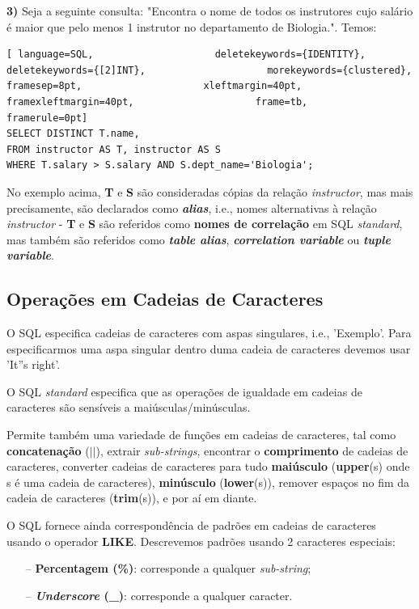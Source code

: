 \documentclass[titlepage]{book}
\theoremstyle{definition}
\begin{document}
\textbf{3)} Seja a seguinte consulta: "Encontra o nome de todos os instrutores cujo salário é maior que pelo menos 1 instrutor no departamento de Biologia.". Temos:
\begin{lstlisting}[ language=SQL,                     deletekeywords={IDENTITY},                     deletekeywords={[2]INT},                     morekeywords={clustered},                     framesep=8pt,                     xleftmargin=40pt,                     framexleftmargin=40pt,                     frame=tb,                     framerule=0pt]
SELECT DISTINCT T.name,
FROM instructor AS T, instructor AS S
WHERE T.salary > S.salary AND S.dept_name='Biologia';
\end{lstlisting}

No exemplo acima, \textbf{T} e \textbf{S} são consideradas cópias da relação \textit{instructor}, mas mais precisamente, são declarados como \textbf{\textit{alias}}, i.e., nomes alternativas à relação \textit{instructor} - \textbf{T} e \textbf{S} são referidos como \textbf{nomes de correlação} em SQL \textit{standard}, mas também são referidos como \textbf{\textit{table alias}}, \textbf{\textit{correlation variable}} ou \textbf{\textit{tuple variable}}.

\subsection{Operações em Cadeias de Caracteres}

O SQL especifica cadeias de caracteres com aspas singulares, i.e., 'Exemplo'. Para especificarmos uma aspa singular dentro duma cadeia de caracteres devemos usar 'It''s right'.

O SQL \textit{standard} especifica que as operações de igualdade em cadeias de caracteres são sensíveis a maiúsculas/minúsculas.

Permite também uma variedade de funções em cadeias de caracteres, tal como \textbf{concatenação} ($||$), extrair \textit{sub-strings}, encontrar o \textbf{comprimento} de cadeias de caracteres, converter cadeias de caracteres para tudo \textbf{maiúsculo} (\textbf{upper}(s) onde s é uma cadeia de caracteres), \textbf{minúsculo} (\textbf{lower}(s)), remover espaços no fim da cadeia de caracteres (\textbf{trim}(s)), e por aí em diante.

O SQL fornece ainda correspondência de padrões em cadeias de caracteres usando o operador \textbf{LIKE}. Descrevemos padrões usando 2 caracteres especiais:
\begin{itemize}
    \itemsep0cm
    \item[--]\textbf{Percentagem (\%)}: corresponde a qualquer \textit{sub-string};
    \item[--]\textbf{\textit{Underscore} (\_)}: corresponde a qualquer caracter.
\end{itemize}
\end{document}

